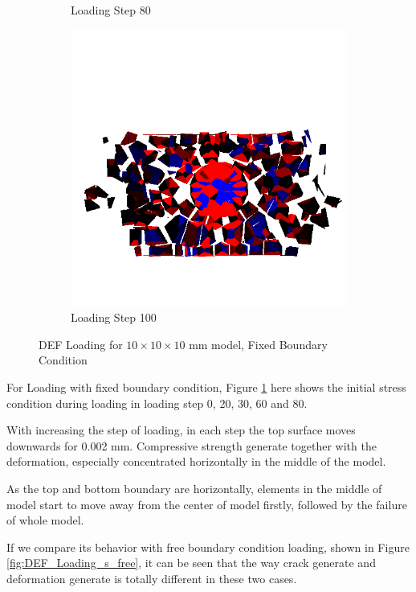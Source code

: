 \begin{figure}[ht!]
\begin{subfigure}{.33\textwidth}
      \caption{Loading Step 80}
      \end{subfigure}%
      \begin{subfigure}{.33\textwidth}
        \centering
        \includegraphics[width=1.0\linewidth]{Files/Small_DEF/IS2/DEP5-STEP(120).png}
        \caption{Loading Step 100}
      \end{subfigure}
  
  \caption{DEF Loading for $10 \times 10 \times 10$ mm model, Fixed Boundary Condition}
  \label{fig:DEF_Loading_s_fix}
\end{figure}

For Loading with fixed boundary condition, Figure \ref{fig:DEF_Loading_s_fix} here shows the initial stress condition during loading in loading step 0, 20, 30, 60 and 80.

With increasing the step of loading, in each step the top surface moves downwards for 0.002 mm. Compressive strength generate together with the deformation, especially concentrated horizontally in the middle of the model.

As the top and bottom boundary are horizontally, elements in the middle of model start to move away from the center of model firstly, followed by the failure of whole model.

If we compare its behavior with free boundary condition loading, shown in Figure \ref{fig:DEF_Loading_s_free}, it can be seen that the way crack generate and deformation generate is totally different in these two cases.

